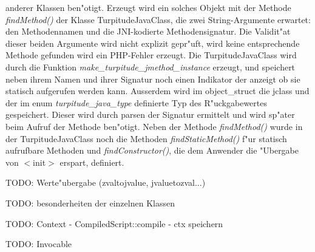 anderer Klassen ben"otigt. Erzeugt wird ein solches Objekt mit der Methode \emph{findMethod()} der Klasse TurpitudeJavaClass, die zwei 
String-Argumente erwartet: den Methodennamen und die JNI-kodierte Methodensignatur. Die Validit"at dieser beiden Argumente wird nicht explizit
gepr"uft, wird keine entsprechende Methode gefunden wird ein PHP-Fehler erzeugt. Die TurpitudeJavaClass wird durch die Funktion
\emph{make\_turpitude\_jmethod\_instance} erzeugt, und speichert neben ihrem Namen und ihrer Signatur noch einen Indikator der anzeigt
ob sie statisch aufgerufen werden kann. Ausserdem wird im object\_struct die jclass und der im enum \emph{turpitude\_java\_type} definierte
Typ des R"uckgabewertes gespeichert. Dieser wird durch parsen der Signatur ermittelt und wird sp"ater beim Aufruf der Methode ben"otigt.
Neben der Methode \emph{findMethod()} wurde in der TurpitudeJavaClass noch die Methoden \emph{findStaticMethod()} f"ur statisch
aufrufbare Methoden und \emph{findConstructor()}, die dem Anwender die "Ubergabe von $<$init$>$ erspart, definiert.


TODO: Werte"ubergabe (zvaltojvalue, jvaluetozval...)

TODO: besonderheiten der einzelnen Klassen


TODO: Context - CompiledScript::compile - ctx speichern

TODO: Invocable



